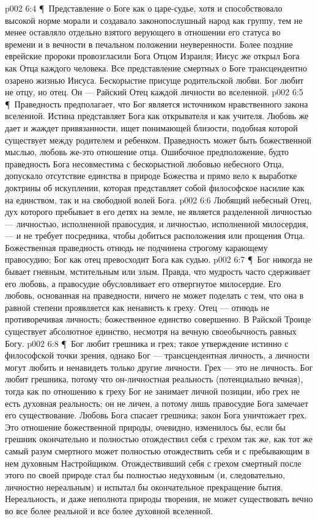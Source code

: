\vs p002 6:4 \P\ Представление о Боге как о царе\hyp{}судье, хотя и способствовало высокой норме морали и создавало законопослушный народ как группу, тем не менее оставляло отдельно взятого верующего в отношении его статуса во времени и в вечности в печальном положении неуверенности. Более поздние еврейские пророки провозгласили Бога Отцом Израиля; Иисус же открыл Бога как Отца каждого человека. Все представление смертных о Боге трансцендентно озарено жизнью Иисуса. Бескорыстие присуще родительской любви. Бог любит не  отцу, но  отец. Он --- Райский Отец каждой личности во вселенной.
\vs p002 6:5 \P\ Праведность предполагает, что Бог является источником нравственного закона вселенной. Истина представляет Бога как открывателя и как учителя. Любовь же дает и жаждет привязанности, ищет понимающей близости, подобная которой существует между родителем и ребенком. Праведность может быть божественной мыслью, любовь же\hyp{}это отношение отца. Ошибочное предположение, будто праведность Бога несовместима с бескорыстной любовью небесного Отца, допускало отсутствие единства в природе Божества и прямо вело к выработке доктрины об искуплении, которая представляет собой философское насилие как на единством, так и на свободной волей Бога.
\vs p002 6:6 Любящий небесный Отец, дух которого пребывает в его детях на земле, не является разделенной личностью --- личностью, исполненной правосудия, и личностью, исполненной милосердия, --- и не требует посредника, чтобы добиться расположения или прощения Отца. Божественная праведность отнюдь не подчинена строгому карающему правосудию; Бог как отец превосходит Бога как судью.
\vs p002 6:7 \P\ Бог никогда не бывает гневным, мстительным или злым. Правда, что мудрость часто сдерживает его любовь, а правосудие обусловливает его отвергнутое милосердие. Его любовь, основанная на праведности, ничего не может поделать с тем, что она в равной степени проявляется как ненависть к греху. Отец --- отнюдь не противоречивая личность; божественное единство совершенно. В Райской Троице существует абсолютное единство, несмотря на вечную своеобычность равных Богу.
\vs p002 6:8 \P\ Бог любит грешника и  грех; такое утверждение истинно с философской точки зрения, однако Бог --- трансцендентная личность, а личности могут любить и ненавидеть только другие личности. Грех --- это не личность. Бог любит грешника, потому что он\hyp{}личностная реальность (потенциально вечная), тогда как по отношению к греху Бог не занимает личной позиции, ибо грех не есть духовная реальность; он не личен, а потому лишь правосудие Бога замечает его существование. Любовь Бога спасает грешника; закон Бога уничтожает грех. Это отношение божественной природы, очевидно, изменилось бы, если бы грешник окончательно и полностью отождествил себя с грехом так же, как тот же самый разум смертного может полностью отождествить себя и с пребывающим в нем духовным Настройщиком. Отождествивший себя с грехом смертный после этого по своей природе стал бы полностью недуховным (и, следовательно, личностно нереальным) и испытал бы окончательное прекращение бытия. Нереальность, и даже неполнота природы творения, не может существовать вечно во все более реальной и все более духовной вселенной.
